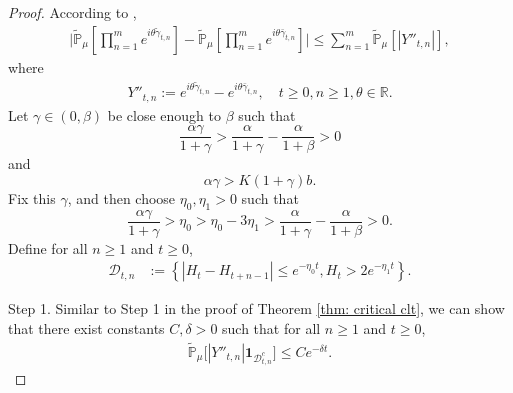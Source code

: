 \documentclass[12pt,a4paper]{amsart}
\theoremstyle{plain}
\theoremstyle{definition}
\numberwithin{equation}{section}
\begin{document}
\begin{proof}
    According to \cite[Lemma 3.4.3]{Durrett2010Probability},
\begin{align}\label{ineq: used next 3}
    \Big|\tilde{\mathbb{P}}_{\mu}[\prod_{n=1}^me^{i\theta \tilde{\gamma}_{t,n}}]-\tilde{\mathbb{P}}_{\mu}[\prod_{n=1}^me^{i\theta \bar{\gamma}_{t,n}}]\Big|\leq \sum_{n=1}^m\tilde{\mathbb{P}}_{\mu}[|Y''_{t,n}|],
\end{align}
    where
\begin{align}
    Y''_{t,n}
    :=e^{i\theta\tilde{\gamma}_{t,n}}-e^{i\theta\bar{\gamma}_{t,n}},\quad t\geq 0, n\geq 1, \theta\in \mathbb{R}.
\end{align}
    Let $\gamma \in (0,\beta)$ be close enough to $\beta$ such that
\[
    \frac{\alpha \gamma}{1+\gamma} 
    > \frac{\alpha}{1+\gamma} - \frac{\alpha}{1+\beta} > 0
\]
    and
\[
    \alpha\gamma
    >K(1+\gamma)b.
\]
    Fix this $\gamma$, and then choose $\eta_0,\eta_1>0$ such that
\[
    \frac{\alpha \gamma}{1+\gamma} 
    > \eta_0 
    > \eta_0 - 3\eta_1 
    > \frac{\alpha}{1+\gamma} - \frac{\alpha}{1+\beta} 
    > 0.
\]
    Define for all $n \geq 1$ and $t\geq 0$,
\begin{align}
\label{def: Dtk1}
    \mathcal{D}_{t,n}
    &:=\left\{|H_t-H_{t+n-1}|\leq  e^{-\eta_0 t}, H_{t}> 2e^{-\eta_1t}\right\}.
\end{align}

    Step 1. Similar to Step 1 in the proof of Theorem \ref{thm: critical clt}, we can show that there exist constants $C,\delta >0$ such that for all $n \geq 1$ and $t\geq 0$,
\begin{align}
\label{thm12111}
    \mathbb{\tilde{P}}_{\mu}\big[|Y''_{t,n}|\mathbf{1}_{\mathcal{D}^c_{t,n}}\big]
    \leq C e^{-\delta t}.
\end{align}
\begin{comment}
    In fact, let $C_1$ be the constant in  Lemma 2.9 corresponding to this fixed $\gamma$ and $C_2$ be the constant in Lemma 2.10.
    By Chebyshev's inequality, there exists $C>0$ such that for all $n \geq 1$ and $t\geq 0$,
\begin{align}
\label{eq: prob of Dtkc11}
    &\mathbb{\tilde{P}}_{\mu}(\mathcal{D}_{t,n}^c)
    \\&\leq \mathbb{\tilde{P}}_{\mu}(|H_t-H_{t+n-1}| > e^{-\eta_0 t})+\mathbb{\tilde{P}}_{\mu}(H_{t}\leq 2e^{-\eta_1 t}),
    \\&\leq \mathbb{P}_{\mu}(D^c)^{-1}e^{\eta_0 t}\mathbb{P}_{\mu}[|H_t-H_{t+n-1}|]+\mathbb{\tilde{P}}(H_t\leq 2e^{-\eta_1 t})
    \\&\leq \mathbb{P}_{\mu}(D^c)^{-1}  e^{\eta_0 t}\|H_t - H_{t+n-1}\|_{\mathbb P_\mu; 1+\gamma}+\mathbb{\tilde{P}}(H_{t}\leq 2e^{-\eta_1t})
    \\&\leq C_1  \mathbb{P}_{\mu}(D^c)^{-1}  e^{-(\frac{\alpha \gamma}{1+\gamma} - \eta_0)t}+C_2 e^{-\eta_1\beta t}.
\end{align}
    This implies the desired result in this step, since $|Y_{t,k}| \leq 2$ a.s..
\end{comment}


\end{proof}
\end{document}
